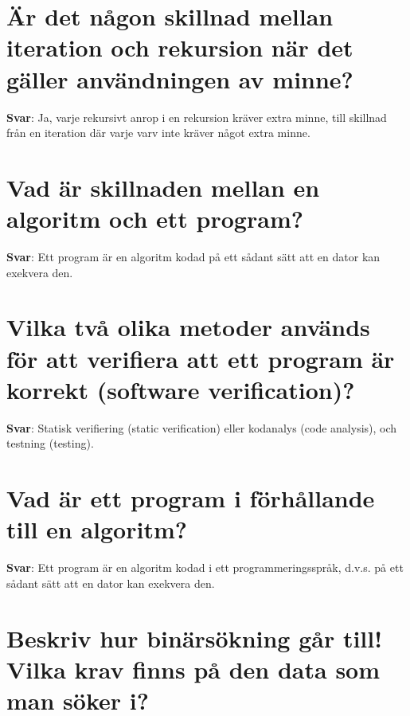 \documentclass[a4paper,11pt,oneside]{book}
\begin{document}
\begin{sloppypar}
\section{\"A\ensuremath{\ddot{}}r det n\r{a}gon skillnad mellan iteration och rekursion n\"ar det g\"aller anv\"andningen av minne?}

\label{q:175:sa:sv:True}

\textbf{Svar}: Ja, varje rekursivt anrop i en rekursion kr\"aver extra minne, till skillnad fr\r{a}n en iteration d\"ar varje varv inte kr\"aver n\r{a}got extra minne.



\section{Vad \"ar skillnaden mellan en algoritm och ett program?}

\label{q:177:sa:sv:True}

\textbf{Svar}: Ett program \"ar en algoritm kodad p\r{a} ett s\r{a}dant s\"att att en dator kan exekvera den.



\section{Vilka tv\r{a} olika metoder anv\"ands f\"or att verifiera att ett program \"ar korrekt (software verification)?}

\label{q:178:sa:sv:True}

\textbf{Svar}: Statisk verifiering (static verification) eller kodanalys (code analysis), och testning (testing).



\section{Vad \"ar ett program i f\"orh\r{a}llande till en algoritm?}

\label{q:179:sa:sv:True}

\textbf{Svar}: Ett program \"ar en algoritm kodad i ett programmeringsspr\r{a}k, d.v.s. p\r{a} ett s\r{a}dant s\"att att en dator kan exekvera den.



\section{Beskriv hur bin\"ars\"okning g\r{a}r till! Vilka krav finns p\r{a} den data som man s\"oker i?}


\end{sloppypar}
\end{document}
